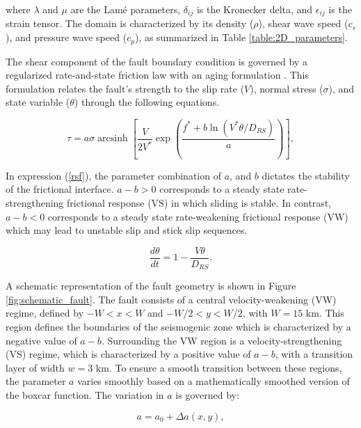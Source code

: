 \documentclass[draft]{agujournal2019}
\DeclareMathOperator{\arcsinh}{arcsinh}
\begin{document}
where \( \lambda \) and \( \mu \) are the Lamé parameters, \( \delta_{ij} \) is the Kronecker delta, and \( \epsilon_{ij} \) is the strain tensor. The domain is characterized by its density (\(\rho\)), shear wave speed (\(c_s\)), and pressure wave speed (\(c_p\)), as summarized in Table \ref{table:2D_parameters}.

The shear component of the fault boundary condition is governed by a regularized rate-and-state friction law with an aging formulation \cite{dieterich1979modeling,ruina1983slip,ben1997dynamic,lapusta2000elastodynamic,ampuero2008earthquake}. This formulation relates the fault's strength to the slip rate (\(V\)), normal stress (\(\sigma\)), and state variable (\(\theta\)) through the following equations.

\begin{equation}
\tau = a \sigma \arcsinh \left[ \frac{V}{2V^*} \exp\left(\frac{f^* + b \ln(V^* \theta / D_{RS})}{a}\right) \right],
\label{rsf}
\end{equation}

In expression (\ref{rsf}), the parameter combination of $a$, and $b$ dictates the stability of the frictional interface. $a-b>0$ corresponds to a steady state rate-strengthening frictional response (VS) in which sliding is stable. In contrast, $a-b<0$ corresponds to a steady state rate-weakening frictional response (VW) which may lead to unstable slip and stick slip sequences.

\begin{equation}
\frac{d\theta}{dt} = 1 - \frac{V\theta}{D_{RS}}.
\end{equation}

A schematic representation of the fault geometry is shown in Figure \ref{fig:schematic_fault}. The fault consists of a central velocity-weakening (VW) regime, defined by \(-W < x < W\) and \(-W/2 < y < W/2\), with \( W = 15 \) km. This region defines the boundaries of the seismogenic zone which is characterized by a negative value of \( a - b \). Surrounding the VW region is a velocity-strengthening (VS) regime, which is characterized by a positive value of \( a - b \), with a transition layer of width \( w = 3 \) km. To ensure a smooth transition between these regions, the parameter \( a \) varies smoothly based on a mathematically smoothed version of the boxcar function. The variation in \( a \) is governed by:

\begin{equation}
a = a_{0} + \Delta a(x,y),
\end{equation}
\end{document}
